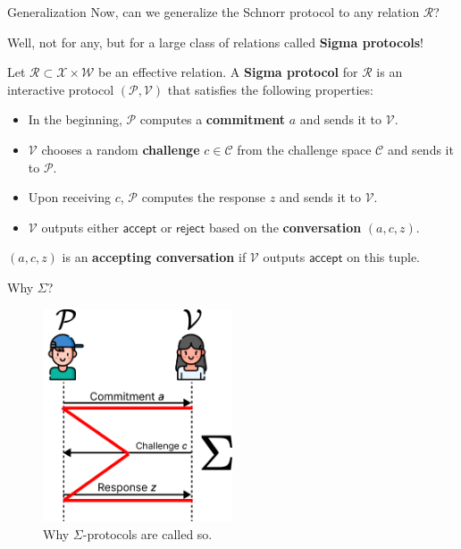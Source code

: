 \documentclass{zkdl-presentation-template}
\begin{document}
    \begin{frame}{Generalization}
        Now, can we generalize the Schnorr protocol to any relation $\mathcal{R}$?

        Well, not for any, but for a large class of relations called \textbf{Sigma protocols}!

        \begin{definition}
            Let $\mathcal{R} \subset \mathcal{X} \times \mathcal{W}$ be an effective relation. A \textbf{Sigma protocol} for $\mathcal{R}$ is an interactive protocol $(\mathcal{P}, \mathcal{V})$ that satisfies the following properties:
            \begin{itemize}
                \item In the beginning, $\mathcal{P}$ computes a \textbf{commitment} $a$ and sends it to $\mathcal{V}$.
                \item $\mathcal{V}$ chooses a random \textbf{challenge} $c \in \mathcal{C}$ from the challenge space $\mathcal{C}$ and sends it to $\mathcal{P}$.
                \item Upon receiving $c$, $\mathcal{P}$ computes the response $z$ and sends it to $\mathcal{V}$.
                \item $\mathcal{V}$ outputs either $\mathsf{accept}$ or $\mathsf{reject}$ based on the \textbf{conversation} $(a,c,z)$.
            \end{itemize}
        \end{definition}

        \begin{definition}
            $(a,c,z)$ is an \textbf{accepting conversation} if $\mathcal{V}$ outputs $\mathsf{accept}$ on this tuple.
        \end{definition}
    \end{frame}

    \begin{frame}{Why $\Sigma$?}
        \begin{figure}
        \centering
            \includegraphics[width=0.5\textwidth]{images/lecture_7/sigma_protocol_illustration.pdf}
            \caption{Why $\Sigma$-protocols are called so.}
        \end{figure}
    \end{frame}
\end{document}
